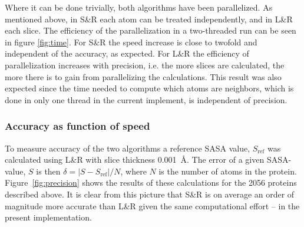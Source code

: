 \documentclass[a4paper,11pt]{article}
\begin{document}
Where it can be done trivially, both algorithms have been
parallelized. As mentioned above, in S\&R each atom can be treated
independently, and in L\&R each slice. The efficiency of the
parallelization in a two-threaded run can be seen in figure
\ref{fig:time}. For S\&R the speed increase is close to twofold and
independent of the accuracy, as expected. For L\&R the efficiency of
parallelization increases with precision, i.e. the more slices are
calculated, the more there is to gain from parallelizing the
calculations. This result was also expected since the time needed to
compute which atoms are neighbors, which is done in only one thread in
the current implement, is independent of precision.

\subsubsection{Accuracy as function of speed}\label{sec:accuracy}

To measure accuracy of the two algorithms a reference SASA value,
$S_\text{ref}$ was calculated using L\&R with slice thickness
0.001~Å. The error of a given SASA-value, $S$ is then $\delta = \lvert
S - S_\text{ref} \rvert / N$, where $N$ is the number of atoms in the
protein. Figure~\ref{fig:precision} shows the results of these
calculations for the 2056 proteins described above.  It is clear from
this picture that S\&R is on average an order of magnitude more
accurate than L\&R given the same computational effort -- in the
present implementation.
\end{document}
